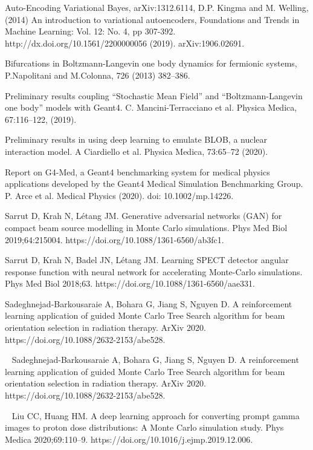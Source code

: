 \begin{thebibliography}{99}
 Auto-Encoding Variational Bayes, arXiv:1312.6114, D.P. Kingma and M. Welling, (2014)
 An introduction to variational autoencoders, Foundations and Trends in Machine Learning: Vol. 12: No. 4, pp 307-392. http://dx.doi.org/10.1561/2200000056 (2019). arXiv:1906.02691.

 Bifurcations in Boltzmann-Langevin one body dynamics for fermionic systems, P.Napolitani and M.Colonna, 726 (2013) 382–386.

 Preliminary results coupling “Stochastic Mean Field” and “Boltzmann-Langevin one body” models with Geant4. C. Mancini-Terracciano et al. Physica Medica, 67:116–122, (2019).

 Preliminary results in using deep
learning to emulate BLOB, a nuclear interaction model. A Ciardiello et al. Physica Medica, 73:65–72 (2020).

 Report on G4-Med, a Geant4 benchmarking system for medical physics applications developed by the Geant4 Medical Simulation Benchmarking Group. P. Arce et al. Medical Physics (2020). doi: 10.1002/mp.14226.


Sarrut D, Krah N, Létang JM. Generative adversarial networks (GAN) for compact beam source modelling in Monte Carlo simulations. Phys Med Biol 2019;64:215004. https://doi.org/10.1088/1361-6560/ab3fc1.

Sarrut D, Krah N, Badel JN, Létang JM. Learning SPECT detector angular response function with neural network for accelerating Monte-Carlo simulations. Phys Med Biol 2018;63. https://doi.org/10.1088/1361-6560/aae331.


Sadeghnejad-Barkousaraie A, Bohara G, Jiang S, Nguyen D. A reinforcement learning application of guided Monte Carlo Tree Search algorithm for beam orientation selection in radiation therapy. ArXiv 2020. https://doi.org/10.1088/2632-2153/abe528.

~
Sadeghnejad-Barkousaraie A, Bohara G, Jiang S, Nguyen D. A reinforcement learning application of guided Monte Carlo Tree Search algorithm for beam orientation selection in radiation therapy. ArXiv 2020. https://doi.org/10.1088/2632-2153/abe528.

~ 
Liu CC, Huang HM. A deep learning approach for converting prompt gamma images to proton dose distributions: A Monte Carlo simulation study. Phys Medica 2020;69:110–9. https://doi.org/10.1016/j.ejmp.2019.12.006.


\end{thebibliography}

